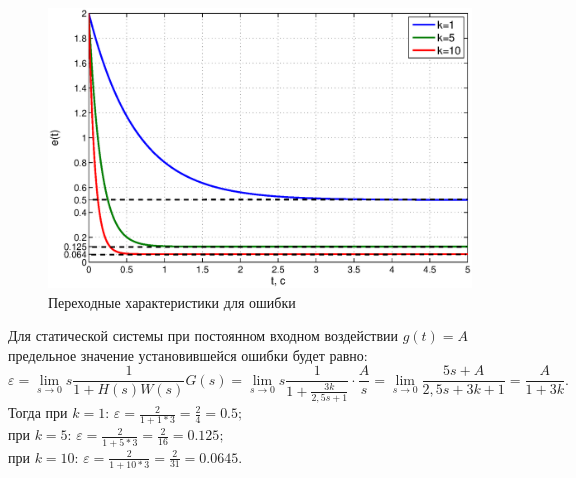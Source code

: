 \documentclass[12pt,a4paper]{article}
\begin{document}
\begin{figure}[H]
	\centering
	\includegraphics[width=1\linewidth]{1.1.2.eps}
	\caption{Переходные характеристики для ошибки}
\end{figure}
Для статической системы при постоянном входном воздействии $g(t)=A$ предельное значение установившейся ошибки будет равно:
\begin{equation}
    \varepsilon = \lim_{s\to 0}s\frac{1}{1+H(s)W(s)}G(s) = \lim_{s\to0} s\frac{1}{1+ \displaystyle{\frac{3k}{2,5s+1}}}\cdot\frac{A}{s} = \lim_{s\to0} \frac{5s+A}{2,5s+3k+1} = \frac{A}{1+3k}.
\end{equation}
Тогда при $k=1$: $\varepsilon = \displaystyle{\frac{2}{1+1*3}} = \frac{2}{4} = 0.5;$\\
при $k=5$: $\varepsilon = \displaystyle{\frac{2}{1+5*3}} = \frac{2}{16} = 0.125;$\\
при $k=10$: $\varepsilon = \displaystyle{\frac{2}{1+10*3}} = \frac{2}{31} = 0.0645.$\\
\end{document}
